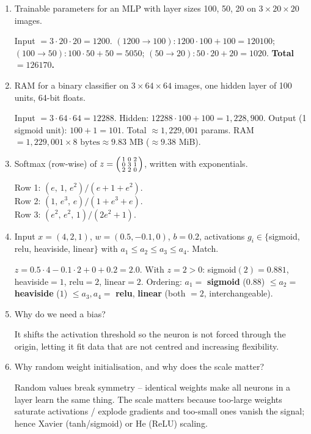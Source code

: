 \documentclass[10pt,a4paper]{article}
\newcommand{\q}[1]{\item #1}
\begin{document}
\begin{enumerate}[leftmargin=*,label=\textbf{Q\arabic*.}]

\q Trainable parameters for an MLP with layer sizes 100, 50, 20 on $3\times20\times20$ images.
\begin{answerbox}
Input $=3\cdot20\cdot20=1200$.
$(1200{\to}100): 1200\cdot100+100=120100$;
$(100{\to}50): 100\cdot50+50=5050$;
$(50{\to}20): 50\cdot20+20=1020$.
\textbf{Total $=126170$.}
\end{answerbox}

\q RAM for a binary classifier on $3\times64\times64$ images, one hidden layer of 100 units, 64-bit floats.
\begin{answerbox}
Input $=3\cdot64\cdot64=12288$. Hidden: $12288\cdot100+100=1{,}228{,}900$. Output (1 sigmoid unit): $100+1=101$. Total $\approx1{,}229{,}001$ params.
RAM $=1{,}229{,}001\times 8\text{ bytes}\approx 9.83$ MB ($\approx 9.38$ MiB).
\end{answerbox}

\q Softmax (row-wise) of $z=\begin{psmallmatrix}1&0&2\\0&3&1\\2&2&0\end{psmallmatrix}$, written with exponentials.
\begin{answerbox}
Row 1: $(e,\,1,\,e^{2})/(e+1+e^{2})$.\\
Row 2: $(1,\,e^{3},\,e)/(1+e^{3}+e)$.\\
Row 3: $(e^{2},\,e^{2},\,1)/(2e^{2}+1)$.
\end{answerbox}

\q Input $x=(4,2,1)$, $w=(0.5,-0.1,0)$, $b=0.2$, activations $g_i\in\{$sigmoid, relu, heaviside, linear$\}$ with $a_1\le a_2\le a_3\le a_4$. Match.
\begin{answerbox}
$z = 0.5\cdot4 - 0.1\cdot2 + 0 + 0.2 = 2.0$. With $z=2>0$: sigmoid$(2)=0.881$, heaviside$=1$, relu$=2$, linear$=2$.
Ordering: $a_1=$ \textbf{sigmoid} ($0.88$) $\le a_2=$ \textbf{heaviside} ($1$) $\le a_3,a_4=$ \textbf{relu}, \textbf{linear} (both $=2$, interchangeable).
\end{answerbox}

\q Why do we need a bias?
\begin{answerbox}
It shifts the activation threshold so the neuron is not forced through the origin, letting it fit data that are not centred and increasing flexibility.
\end{answerbox}

\q Why random weight initialisation, and why does the scale matter?
\begin{answerbox}
Random values break symmetry -- identical weights make all neurons in a layer learn the same thing. The scale matters because too-large weights saturate activations / explode gradients and too-small ones vanish the signal; hence Xavier (tanh/sigmoid) or He (ReLU) scaling.
\end{answerbox}


\end{enumerate}
\end{document}
